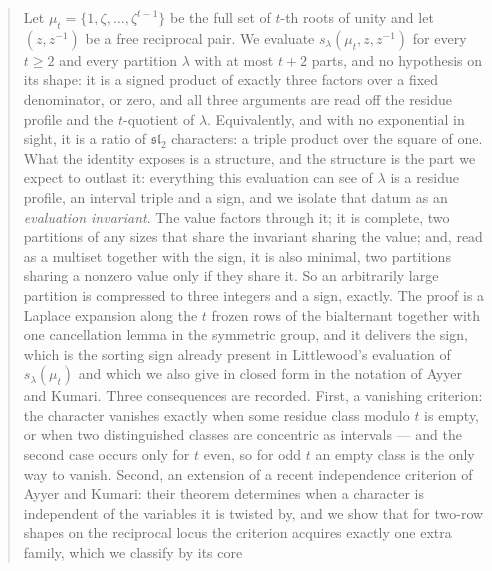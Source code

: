 \documentclass[11pt,reqno]{amsart}
\theoremstyle{plain}
\theoremstyle{definition}
\newcommand{\zt}{\mu_t}
\begin{document}
\begin{abstract}
\ifdefined\LONGABS
Let $\zt=\{1,\zeta,\dots,\zeta^{t-1}\}$ be the full set of $t$-th roots of unity and let
$(z,z^{-1})$ be a free reciprocal pair. We evaluate $s_\lambda(\zt,z,z^{-1})$ for every $t\ge2$ and
every partition $\lambda$ with at most $t+2$ parts, and no hypothesis on its shape: it is a signed product of
exactly three factors over a fixed denominator, or zero, and all three arguments are read off the
residue profile and the
$t$-quotient of $\lambda$. Equivalently, and with no exponential in sight, it is a ratio of
$\mathfrak{sl}_2$ characters: a triple product over the square of one. What the identity exposes is a
structure, and the structure is the part we expect to outlast it: everything this evaluation can see
of $\lambda$ is a residue profile, an interval triple and a sign, and we isolate that datum as an
\emph{evaluation invariant}. The value factors through it; it is complete, two partitions of
any sizes that share the invariant sharing the value; and, read as a multiset together with the
sign, it is also minimal, two partitions sharing a nonzero value only if they share it. So an
arbitrarily large partition is compressed to three integers and a sign, exactly. The proof is a Laplace
expansion along the $t$ frozen rows of the
bialternant together with one cancellation lemma in the symmetric group, and it delivers the sign,
which is the sorting sign already present in Littlewood's evaluation of $s_\lambda(\zt)$ and which we
also give in closed form in the notation of Ayyer and Kumari. Three
consequences are recorded. First, a vanishing criterion: the character vanishes exactly when some
residue class modulo $t$ is empty, or when two distinguished classes are concentric as intervals ---
and the second case occurs only for $t$ even, so for odd $t$ an empty class is the only way to
vanish. Second, an extension of a recent independence criterion of Ayyer and Kumari: their theorem
determines when a character is independent of the variables it is twisted by, and we show that for
two-row shapes on the reciprocal locus the criterion acquires exactly one extra family, which we classify by its core

\end{abstract}
\end{document}
